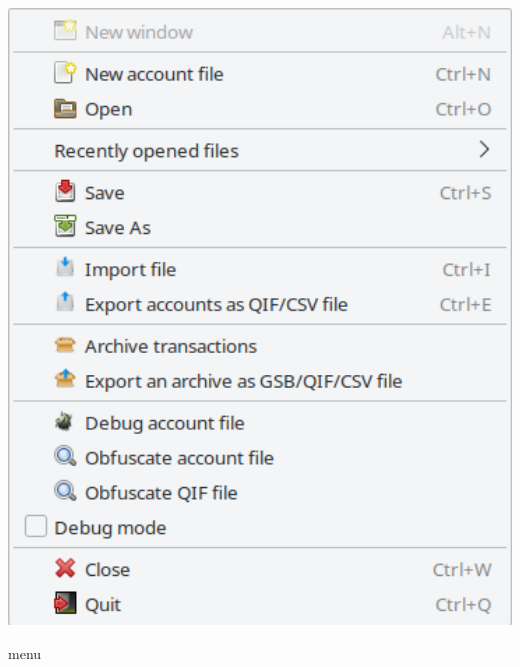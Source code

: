 \begin{minipage}{.3\linewidth}
	\vspace{-10pt}					%
	\centering						%
	\includegraphics[width=1\textwidth]{image/screenshot/home_menubar_file}
	\vspace{-10pt}					%
	\captionsetup{
		type=figure,%
		name=Fig.,%
		labelsep=newline}			%
	\caption{ menu}	%
	\label{home_menubar_file}
\end{minipage}

